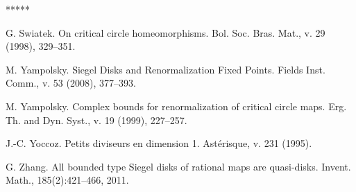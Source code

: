 \documentclass{amsart}
\newcommand{\1}{{\mathbb 1 }}
\theoremstyle{remark}
\numberwithin{equation}{section}
\theoremstyle{definition}
\begin{document}
\begin{thebibliography}{*****}
 


 G. Swiatek. On critical circle homeomorphisms. Bol. Soc. Bras. Mat., v. 29 (1998), 329--351.

 




 M. Yampolsky.  Siegel Disks and Renormalization Fixed Points.
  Fields Inst. Comm., v. 53 (2008), 377--393.  


 M. Yampolsky. Complex bounds for
  renormalization of critical circle maps. Erg. Th. and Dyn. Syst.,
  v. 19 (1999), 227--257. 
   

 J.-C. Yoccoz. Petits diviseurs en dimension 1. Ast\'erisque, v. 231 (1995).


 G. Zhang. All bounded type Siegel disks of rational maps are quasi-disks. Invent. Math., 185(2):421–466, 2011.


\end{thebibliography}
\end{document}
